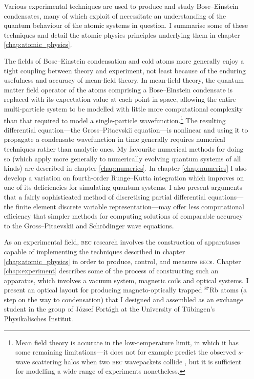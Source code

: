 Various experimental techniques are used to produce and study Bose--Einstein condensates, many of which exploit of necessitate an understanding of the quantum behaviour of the atomic systems in question. I summarise some of these techniques and detail the atomic physics principles underlying them in chapter \ref{chap:atomic_physics}.

The fields of Bose--Einstein condensation and cold atoms more generally enjoy a tight coupling between theory and experiment, not least because of the enduring usefulness and accuracy of mean-field theory. In mean-field theory, the quantum matter field operator of the atoms comprising a Bose--Einstein condensate is replaced with its expectation value at each point in space, allowing the entire multi-particle system to be modelled with little more computational complexity than that required to model a single-particle wavefunction.\footnote{Mean field theory is accurate in the low-temperature limit, in which it has some remaining limitations---it does not for example predict the observed $s$-wave scattering halos when two \textsc{bec} wavepackets collide \cite{norrie_quantum_2006}, but it is sufficient for modelling a  wide range of experiments nonetheless.} The resulting differential equation---the Gross--Pitaevskii equation---is nonlinear and using it to propagate a condensate wavefunction in time generally requires numerical techniques rather than analytic ones. My favourite numerical methods for doing so (which apply more generally to numerically evolving quantum systems of all kinds) are described in chapter \ref{chap:numerics}. In chapter \ref{chap:numerics} I also develop a variation on fourth-order Runge--Kutta integration which improves on one of its deficiencies for simulating quantum systems. I also present arguments that a fairly sophisticated method of discretising partial differential equations---the finite element discrete variable representation---may offer less computational efficiency that simpler methods for computing solutions of comparable accuracy to the Gross--Pitaevskii and Schr\"odinger wave equations.

As an experimental field, \textsc{bec} research involves the construction of apparatuses capable of implementing the techniques described in chapter \ref{chap:atomic_physics} in order to produce, control, and measure \textsc{bec}s. Chapter \ref{chap:experiment} describes some of the process of constructing such an apparatus, which involves a vacuum system, magnetic coils and optical systems. I present an optical layout for producing magneto-optically trapped $^{87}$Rb atoms (a step on the way to condensation) that I designed and assembled as an exchange student in the group of József Fortágh at the University of T\"ubingen's Physikalisches Institut.

